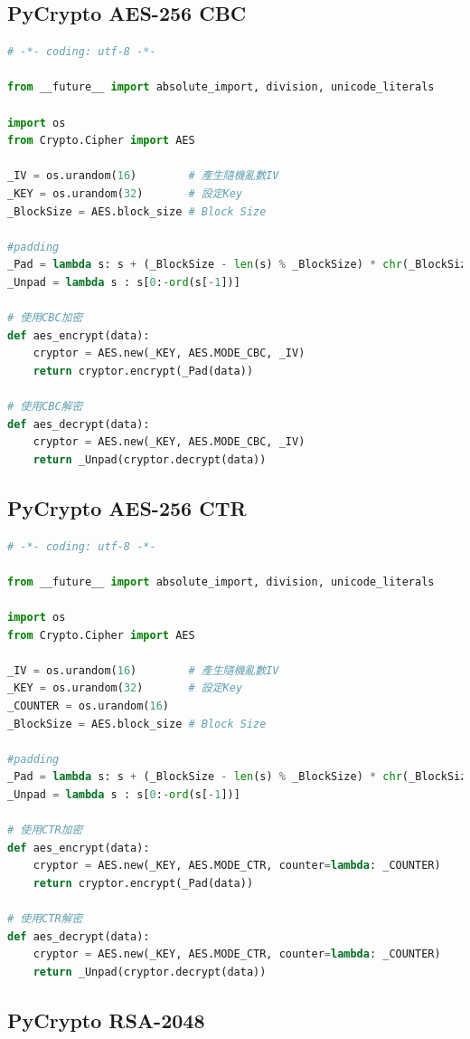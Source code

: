 \documentclass[12pt,a4paper]{article}
\begin{document}
\subsection{PyCrypto AES-256 CBC}
{
\begin{lstlisting}[language=Python]
# -*- coding: utf-8 -*-

from __future__ import absolute_import, division, unicode_literals

import os
from Crypto.Cipher import AES

_IV = os.urandom(16)		# 產生隨機亂數IV
_KEY = os.urandom(32)		# 設定Key
_BlockSize = AES.block_size	# Block Size

#padding
_Pad = lambda s: s + (_BlockSize - len(s) % _BlockSize) * chr(_BlockSize - len(s) % _BlockSize)
_Unpad = lambda s : s[0:-ord(s[-1])]

# 使用CBC加密
def aes_encrypt(data):
    cryptor = AES.new(_KEY, AES.MODE_CBC, _IV)
    return cryptor.encrypt(_Pad(data))

# 使用CBC解密
def aes_decrypt(data):
    cryptor = AES.new(_KEY, AES.MODE_CBC, _IV)
    return _Unpad(cryptor.decrypt(data))
\end{lstlisting}
}

\subsection{PyCrypto AES-256 CTR}
{
\begin{lstlisting}[language=Python]
# -*- coding: utf-8 -*-

from __future__ import absolute_import, division, unicode_literals

import os
from Crypto.Cipher import AES

_IV = os.urandom(16)		# 產生隨機亂數IV
_KEY = os.urandom(32)		# 設定Key
_COUNTER = os.urandom(16)
_BlockSize = AES.block_size # Block Size

#padding
_Pad = lambda s: s + (_BlockSize - len(s) % _BlockSize) * chr(_BlockSize - len(s) % _BlockSize)
_Unpad = lambda s : s[0:-ord(s[-1])]

# 使用CTR加密
def aes_encrypt(data):
    cryptor = AES.new(_KEY, AES.MODE_CTR, counter=lambda: _COUNTER)
    return cryptor.encrypt(_Pad(data))

# 使用CTR解密
def aes_decrypt(data):
    cryptor = AES.new(_KEY, AES.MODE_CTR, counter=lambda: _COUNTER)
    return _Unpad(cryptor.decrypt(data))
\end{lstlisting}
}

\subsection{PyCrypto RSA-2048}
{
\begin{lstlisting}[language=Python]
	
\end{lstlisting}
}
\end{document}
